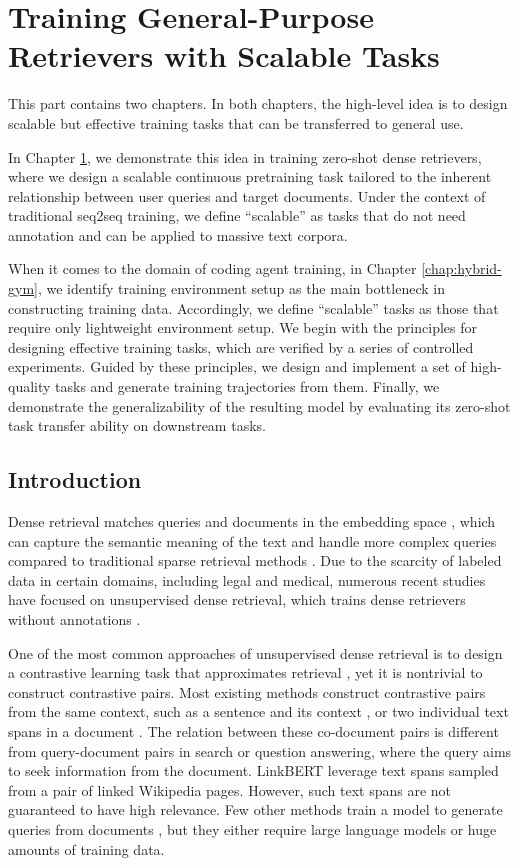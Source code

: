 \chapter{Training General-Purpose Retrievers with Scalable Tasks}
\label{chap:anchor-dr}

This part contains two chapters.
In both chapters, the high-level idea is to design scalable but effective training tasks that can be transferred to general use.

In Chapter \ref{chap:anchor-dr}, we demonstrate this idea in training zero-shot dense retrievers, where we design a scalable continuous pretraining task tailored to the inherent relationship between user queries and target documents.
Under the context of traditional seq2seq training, we define ``scalable'' as tasks that do not need annotation and can be applied to massive text corpora.

When it comes to the domain of coding agent training, in Chapter \ref{chap:hybrid-gym}, we identify training environment setup as the main bottleneck in constructing training data. Accordingly, we define ``scalable'' tasks as those that require only lightweight environment setup.
We begin with the principles for designing effective training tasks, which are verified by a series of controlled experiments. 
Guided by these principles, we design and implement a set of high-quality tasks and generate training trajectories from them. 
Finally, we demonstrate the generalizability of the resulting model by evaluating its zero-shot task transfer ability on downstream tasks.

\section{Introduction}
Dense retrieval matches queries and documents in the embedding space \cite{DPR,ORQA,ANCE}, which can capture the semantic meaning of the text and handle more complex queries compared to traditional sparse retrieval methods \cite{BM25}.
Due to the scarcity of labeled data in certain domains, including legal and medical, numerous recent studies have focused on unsupervised dense retrieval, which trains dense retrievers without annotations \cite{ICT,contriever,cocondenser,QExt}.

One of the most common approaches of unsupervised dense retrieval is to design a contrastive learning task that approximates retrieval \cite{ICT,cocondenser,COCOLM,contriever,spider,SPAR,QExt}, yet it is nontrivial to construct contrastive pairs.
Most existing methods construct contrastive pairs from the same context, such as a sentence and its context \cite{ICT}, or two individual text spans in a document \cite{COCOLM,cocondenser,contriever}. The relation between these co-document pairs is different from query-document pairs in search or question answering, where the query aims to seek information from the document.
LinkBERT \cite{linkbert} leverage text spans sampled from a pair of linked Wikipedia pages. However, such text spans are not guaranteed to have high relevance.
Few other methods train a model to generate queries from documents \cite{InPars,QExt}, but they either require large language models or huge amounts of training data.


